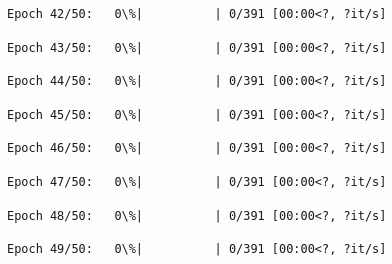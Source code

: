 \documentclass[11pt]{article}
\begin{document}
    
    
    \begin{Verbatim}[commandchars=\\\{\}]
Epoch 42/50:   0\%|          | 0/391 [00:00<?, ?it/s]
    \end{Verbatim}

    
    
    \begin{Verbatim}[commandchars=\\\{\}]
Epoch 43/50:   0\%|          | 0/391 [00:00<?, ?it/s]
    \end{Verbatim}

    
    
    \begin{Verbatim}[commandchars=\\\{\}]
Epoch 44/50:   0\%|          | 0/391 [00:00<?, ?it/s]
    \end{Verbatim}

    
    
    \begin{Verbatim}[commandchars=\\\{\}]
Epoch 45/50:   0\%|          | 0/391 [00:00<?, ?it/s]
    \end{Verbatim}

    
    
    \begin{Verbatim}[commandchars=\\\{\}]
Epoch 46/50:   0\%|          | 0/391 [00:00<?, ?it/s]
    \end{Verbatim}

    
    
    \begin{Verbatim}[commandchars=\\\{\}]
Epoch 47/50:   0\%|          | 0/391 [00:00<?, ?it/s]
    \end{Verbatim}

    
    
    \begin{Verbatim}[commandchars=\\\{\}]
Epoch 48/50:   0\%|          | 0/391 [00:00<?, ?it/s]
    \end{Verbatim}

    
    
    \begin{Verbatim}[commandchars=\\\{\}]
Epoch 49/50:   0\%|          | 0/391 [00:00<?, ?it/s]
    \end{Verbatim}
\end{document}
